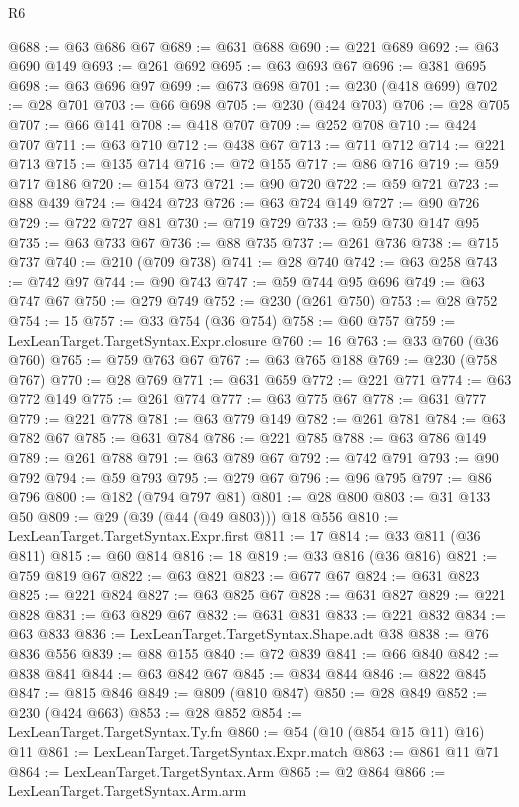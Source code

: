 \begin{lexlean}{R6}
\begin{coremodule}
@688 := @63 @686 @67
@689 := @631 @688
@690 := @221 @689
@692 := @63 @690 @149
@693 := @261 @692
@695 := @63 @693 @67
@696 := @381 @695
@698 := @63 @696 @97
@699 := @673 @698
@701 := @230 (@418 @699)
@702 := @28 @701
@703 := @66 @698
@705 := @230 (@424 @703)
@706 := @28 @705
@707 := @66 @141
@708 := @418 @707
@709 := @252 @708
@710 := @424 @707
@711 := @63 @710
@712 := @438 @67
@713 := @711 @712
@714 := @221 @713
@715 := @135 @714
@716 := @72 @155
@717 := @86 @716
@719 := @59 @717 @186
@720 := @154 @73
@721 := @90 @720
@722 := @59 @721
@723 := @88 @439
@724 := @424 @723
@726 := @63 @724 @149
@727 := @90 @726
@729 := @722 @727 @81
@730 := @719 @729
@733 := @59 @730 @147 @95
@735 := @63 @733 @67
@736 := @88 @735
@737 := @261 @736
@738 := @715 @737
@740 := @210 (@709 @738)
@741 := @28 @740
@742 := @63 @258
@743 := @742 @97
@744 := @90 @743
@747 := @59 @744 @95 @696
@749 := @63 @747 @67
@750 := @279 @749
@752 := @230 (@261 @750)
@753 := @28 @752
@754 := 15
@757 := @33 @754 (@36 @754)
@758 := @60 @757
@759 := LexLeanTarget.TargetSyntax.Expr.closure
@760 := 16
@763 := @33 @760 (@36 @760)
@765 := @759 @763 @67
@767 := @63 @765 @188
@769 := @230 (@758 @767)
@770 := @28 @769
@771 := @631 @659
@772 := @221 @771
@774 := @63 @772 @149
@775 := @261 @774
@777 := @63 @775 @67
@778 := @631 @777
@779 := @221 @778
@781 := @63 @779 @149
@782 := @261 @781
@784 := @63 @782 @67
@785 := @631 @784
@786 := @221 @785
@788 := @63 @786 @149
@789 := @261 @788
@791 := @63 @789 @67
@792 := @742 @791
@793 := @90 @792
@794 := @59 @793
@795 := @279 @67
@796 := @96 @795
@797 := @86 @796
@800 := @182 (@794 @797 @81)
@801 := @28 @800
@803 := @31 @133 @50
@809 := @29 (@39 (@44 (@49 @803))) @18 @556
@810 := LexLeanTarget.TargetSyntax.Expr.first
@811 := 17
@814 := @33 @811 (@36 @811)
@815 := @60 @814
@816 := 18
@819 := @33 @816 (@36 @816)
@821 := @759 @819 @67
@822 := @63 @821
@823 := @677 @67
@824 := @631 @823
@825 := @221 @824
@827 := @63 @825 @67
@828 := @631 @827
@829 := @221 @828
@831 := @63 @829 @67
@832 := @631 @831
@833 := @221 @832
@834 := @63 @833
@836 := LexLeanTarget.TargetSyntax.Shape.adt @38
@838 := @76 @836 @556
@839 := @88 @155
@840 := @72 @839
@841 := @66 @840
@842 := @838 @841
@844 := @63 @842 @67
@845 := @834 @844
@846 := @822 @845
@847 := @815 @846
@849 := @809 (@810 @847)
@850 := @28 @849
@852 := @230 (@424 @663)
@853 := @28 @852
@854 := LexLeanTarget.TargetSyntax.Ty.fn
@860 := @54 (@10 (@854 @15 @11) @16) @11
@861 := LexLeanTarget.TargetSyntax.Expr.match
@863 := @861 @11 @71
@864 := LexLeanTarget.TargetSyntax.Arm
@865 := @2 @864
@866 := LexLeanTarget.TargetSyntax.Arm.arm

\end{coremodule}
\end{lexlean}
